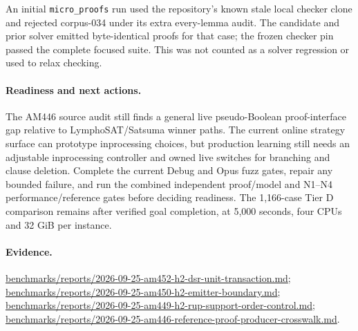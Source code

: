 \documentclass[11pt]{article}
\begin{document}
An initial \texttt{micro\_proofs} run used the repository's known stale local
checker clone and rejected corpus-034 under its extra every-lemma audit. The
candidate and prior solver emitted byte-identical proofs for that case; the
frozen checker pin passed the complete focused suite. This was not counted as
a solver regression or used to relax checking.

\paragraph{Readiness and next actions.}
The AM446 source audit still finds a general live pseudo-Boolean proof-interface
gap relative to LymphoSAT/Satsuma winner paths. The current online strategy
surface can prototype inprocessing choices, but production learning still
needs an adjustable inprocessing controller and owned live switches for
branching and clause deletion. Complete the current Debug and Opus fuzz gates,
repair any bounded failure, and run the combined independent proof/model and
N1--N4 performance/reference gates before deciding readiness. The 1,166-case
Tier D comparison remains after verified goal completion, at 5,000 seconds,
four CPUs and 32 GiB per instance.

\paragraph{Evidence.}
\url{benchmarks/reports/2026-09-25-am452-h2-dsr-unit-transaction.md};
\url{benchmarks/reports/2026-09-25-am450-h2-emitter-boundary.md};
\url{benchmarks/reports/2026-09-25-am449-h2-rup-support-order-control.md};
\url{benchmarks/reports/2026-09-25-am446-reference-proof-producer-crosswalk.md}.
\end{document}
